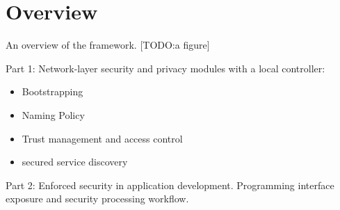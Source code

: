 \section{Overview}

An overview of the framework. [TODO:a figure]

Part 1: Network-layer security and privacy modules with a local controller:
\begin{itemize}
	\item Bootstrapping
	\item Naming Policy
	\item Trust management and access control
	\item secured service discovery
\end{itemize}

Part 2: Enforced security in application development.
Programming interface exposure and security processing workflow.
